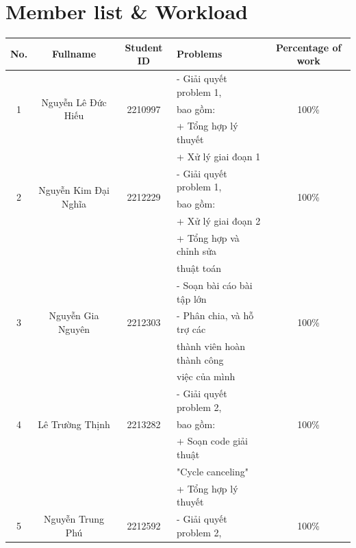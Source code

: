 \documentclass[a4paper]{article}
\begin{document}

\newpage
\tableofcontents
\newpage


\section{Member list \& Workload}

\begin{center}
\begin{tabular}{|c|c|c|l|c|}
\hline
\textbf{No.} & \textbf{Fullname} & \textbf{Student ID} & \textbf{Problems} & \textbf{Percentage of work}\\
\hline 
\multirow{3}{*}{1} & \multirow{3}{*}{Nguyễn Lê Đức Hiếu} & \multirow{3}{*}{2210997} & - Giải quyết problem 1,& \multirow{3}{*}{100\%}\\
& &  & bao gồm:&\\
 & &  & + Tổng hợp lý thuyết &\\
 & &  & + Xử lý giai đoạn 1 &\\
\hline 
\multirow{3}{*}{2} & \multirow{3}{*}{Nguyễn Kim Đại Nghĩa} & \multirow{3}{*}{2212229} & - Giải quyết problem 1,& \multirow{3}{*}{100\%}\\
& &  & bao gồm:&\\
 & &  & + Xử lý giai đoạn 2 &\\
 & &  & + Tổng hợp và chỉnh sửa&\\
 & &  & thuật toán &\\
\hline
\multirow{3}{*}{3} & \multirow{3}{*}{Nguyễn Gia Nguyên} & \multirow{3}{*}{2212303} & -  Soạn bài cáo bài tập lớn & \multirow{3}{*}{100\%}\\
 & &  & - Phân chia, và hỗ trợ các&\\
 & &  &thành viên hoàn thành công&\\
  & & &việc của mình &\\
\hline 
\multirow{3}{*}{4} & \multirow{3}{*}{Lê Trường Thịnh} & \multirow{3}{*}{2213282} & - Giải quyết problem 2,& \multirow{3}{*}{100\%}\\
& &  &bao gồm:&\\
 & &  & + Soạn code giải thuật&\\
  & &  &"Cycle canceling"&\\
 & &  & + Tổng hợp lý thuyết&\\
\hline
\multirow{3}{*}{5} & \multirow{3}{*}{Nguyễn Trung Phú} & \multirow{3}{*}{2212592} & - Giải quyết problem 2,& \multirow{3}{*}{100\%}\\

\end{tabular}
\end{center}
\end{document}
